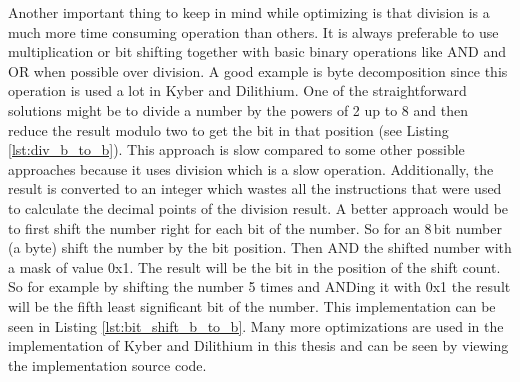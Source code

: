 Another important thing to keep in mind while optimizing is that division is a much more time consuming operation than others. It is always preferable to use multiplication or bit shifting together with basic binary operations like AND and OR when possible over division. A good example is byte decomposition since this operation is used a lot in Kyber and Dilithium. One of the straightforward solutions might be to divide a number by the powers of 2 up to 8 and then reduce the result modulo two to get the bit in that position (see Listing \ref{lst:div_b_to_b}).
\noindent This approach is slow compared to some other possible approaches because it uses division which is a slow operation. Additionally, the result is converted to an integer which wastes all the instructions that were used to calculate the decimal points of the division result. A better approach would be to first shift the number right for each bit of the number. So for an 8\,bit number (a byte) shift the number by the bit position. Then AND the shifted number with a mask of value 0x1. The result will be the bit in the position of the shift count. So for example by shifting the number 5 times and ANDing it with 0x1 the result will be the fifth least significant bit of the number. This implementation can be seen in Listing \ref{lst:bit_shift_b_to_b}. Many more optimizations are used in the implementation of Kyber and Dilithium in this thesis and can be seen by viewing the implementation source code.
